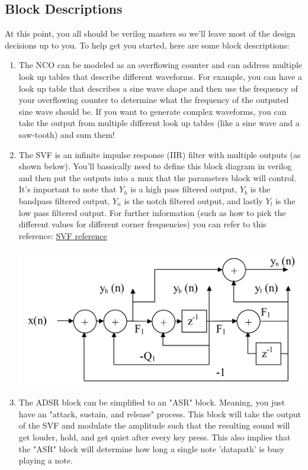 \documentclass[11pt]{article}
\begin{document}
\subsection{Block Descriptions}
At this point, you all should be verilog masters so we'll leave most of the design decisions up to you. To help get you started, here are some block descriptions:
\begin{enumerate}
    \item The NCO can be modeled as an overflowing counter and can address multiple look up tables that describe different waveforms. For example, you can have a look up table that describes a sine wave shape and then use the frequency of your overflowing counter to determine what the frequency of the outputed sine wave should be. If you want to generate complex waveforms, you can take the output from multiple different look up tables (like a sine wave and a saw-tooth) and sum them!
    \item The SVF is an infinite impulse response (IIR) filter with multiple outputs (as shown below). You'll bassically need to define this block diagram in verilog and then put the outputs into a mux that the parameters block will control. It's important to note that $Y_h$ is a high pass filtered output, $Y_b$ is the bandpass filtered output, $Y_n$ is the notch filtered output, and lastly $Y_l$ is the low pass filtered output. For further information (such as how to pick the different values for different corner frequencies) you can refer to this reference: \href{https://karmafx.net/docs/karmafx_digitalfilters.pdf}{SVF reference}
        \begin{center}
        \includegraphics[width=\textwidth/2]{images/svf.png}
        \end{center}
    \item The ADSR block can be simplified to an "ASR" block. Meaning, you just have an "attack, sustain, and release" process. This block will take the output of the SVF and modulate the amplitude such that the resulting sound will get louder, hold, and get quiet after every key press. This also implies that the "ASR" block will determine how long a single note 'datapath' is busy playing a note.
\end{enumerate}
\end{document}
